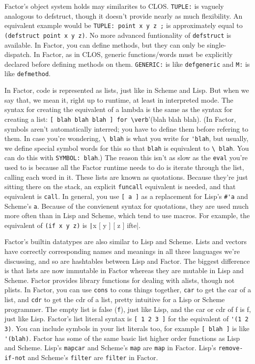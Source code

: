 \documentclass{article}
\begin{document}
Factor's object system holds may similarites to CLOS. \texttt{TUPLE:} is vaguely analogous to defstruct, though it doesn't provide nearly as much flexibility. An equivalent example would be \verb|TUPLE: point x y z ;| is approximately equal to \verb|(defstruct point x y z)|. No more advanced funtionality of \texttt{defstruct} is available. In Factor, you can define methods, but they can only be single-dispatch. In Factor, as in CLOS, generic functions/words must be explicitly declared before defining methods on them. \texttt{GENERIC:} is like \texttt{defgeneric} and \texttt{M:} is like \texttt{defmethod}. 

In Factor, code is represented as lists, just like in Scheme and Lisp. But when we say that, we mean it, right up to runtime, at least in interpreted mode. The syntax for creating the equivalent of a lambda is the same as the syntax for creating a list: \verb|[ blah blah blah ] for \verb|'(blah blah blah). (In Factor, symbols aren't automatically interred; you have to define them before refering to them. In case you're wondering, \verb|\ blah| is what you write for \verb|'blah|, but usually, we define special symbol words for this so that \verb|blah| is equivalent to \verb|\ blah|. You can do this with \verb|SYMBOL: blah|.) The reason this isn't as slow as the \texttt{eval} you're used to is because all the Factor runtime needs to do is iterate through the list, calling each word in it. These lists are known as quotations. Because they're just sitting there on the stack, an explicit \texttt{funcall} equivalent is needed, and that equivalent is \texttt{call}. In general, you use \verb|[ a ]| as a replacement for Lisp's \verb|#'a| and Scheme's \verb|a|. Because of the convienent syntax for quotations, they are used much more often than in Lisp and Scheme, which tend to use macros. For example, the equivalent of \verb|(if x y z)| is \texttt|x [ y ] [ z ] ifte|.

Factor's builtin datatypes are also similar to Lisp and Scheme. Lists and vectors have correctly corresponding names and meanings in all three languages we're discussing, and so are hashtables between Lisp and Factor. The biggest difference is that lists are now immutable in Factor whereas they are mutable in Lisp and Scheme. Factor provides library functions for dealing with alists, though not plists. In Factor, you can use \texttt{cons} to cons things together, \texttt{car} to get the car of a list, and \texttt{cdr} to get the cdr of a list, pretty intuitive for a Lisp or Scheme programmer. The empty list is false (\texttt{f}), just like Lisp, and the car or cdr of f is f, just like Lisp. Factor's list literal syntax is \verb|[ 1 2 3 ]| for the equivalent of \verb|'(1 2 3)|. You can include symbols in your list literals too, for example \verb|[ blah ]| is like \verb|'(blah)|. Factor has some of the same basic list higher order functions as Lisp and Scheme. Lisp's \texttt{mapcar} and Scheme's \texttt{map} are \texttt{map} in Factor. Lisp's \texttt{remove-if-not} and Scheme's \texttt{filter} are \texttt{filter} in Factor.
\end{document}

